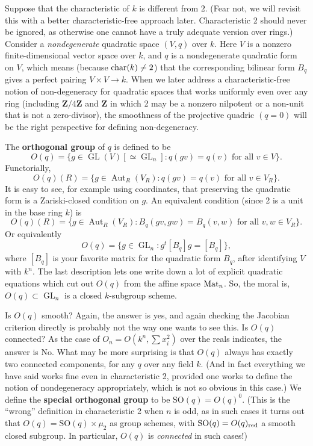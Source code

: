 \documentclass[10pt]{article}
\newcommand{\ZZ}{\mathbf{Z}}
\newcommand{\GL}{\operatorname{GL}}
\renewcommand{\(}{\left(}
\renewcommand{\)}{\right)}
\DeclareMathOperator{\Aut}{Aut}
\newcommand{\SO}{\mathrm{SO}}
\numberwithin{thm}{subsection}
\begin{document}
\begin{ex}[$B_n$ and $D_n$]\label{exampleBD}
Suppose that the characteristic of $k$ is different from $2$.
(Fear not, we will revisit this with a better characteristic-free approach later. Characteristic 2 should never be ignored,
as otherwise one cannot have a truly adequate version over rings.)
Consider a \textit{nondegenerate} quadratic space $(V,q)$ over $k$.
Here $V$ is a nonzero finite-dimensional vector space over $k$, and $q$ is
a nondegenerate quadratic form on $V$, 
which means (because ${\rm{char}}(k) \ne 2$) 
that the corresponding bilinear form $B_q$ gives a perfect pairing $V\times V\to k$.
When we later address a characteristic-free notion of non-degeneracy for quadratic spaces
that works uniformly even over any ring (including
$\ZZ/4\ZZ$ and $\ZZ$ in which 2 may be a nonzero nilpotent or a non-unit that is not a zero-divisor),
the smoothness of the projective quadric $(q=0)$ will be the right perspective for defining non-degeneracy.

The \textbf{orthogonal group} of $q$ is defined to be
\[O(q)=\{g\in \GL(V)[\simeq \GL_n]:q(gv)=q(v) \mbox{ for all } v\in V\}.\]
Functorially,
\[O(q)(R)=\{g\in\Aut_R(V_R):q(gv)=q(v) \mbox{ for all } v\in V_R\}.\]
It is easy to see, for example using coordinates, that preserving the quadratic form is a Zariski-closed condition on $g$.
An equivalent condition (since 2 is a unit in the base ring $k$) is
\[O(q)(R)=\{g\in\Aut_R(V_R):B_q(gv,gw)=B_q(v,w) \mbox{ for all } v,w\in V_R\}.\]
Or equivalently
\[O(q)=\{g\in \GL_n:g^t[B_q]g=[B_q]\},\]
where $[B_q]$ is your favorite matrix for the quadratic form $B_q$, after
identifying $V$ with $k^n$.
The last description lets one write down a lot of explicit quadratic equations which cut out $O(q)$ from the affine space ${\rm{Mat}}_n$.
So, the moral is, $O(q)\subset \GL_n$ is a closed $k$-subgroup scheme.

Is $O(q)$ smooth? Again, the answer is yes, and again checking the Jacobian criterion directly is probably not the way one wants to see this.
Is $O(q)$ connected? As the case of $O_n=O(k^n,\sum x_i^2)$
over the reals indicates, the answer is No.
What may be more surprising is that $O(q)$ always has exactly two connected components, for any $q$ over any field $k$. 
(And in fact everything we have said works fine even in characteristic 2, provided one works to define the notion of nondegeneracy appropriately, which is not so obvious in this case.)
We define the \textbf{special orthogonal group}
to be $\SO(q)=O(q)^0$. (This is the ``wrong'' definition in characteristic 2 when $n$ is odd,
as in such cases it turns out that $O(q) = \SO(q) \times \mu_2$ as group schemes,
with $\SO(q) = O(q)_{\rm{red}}$ a smooth closed subgroup.  In particular, 
$O(q)$ is {\em connected} in such cases!) 


\end{ex}
\end{document}
